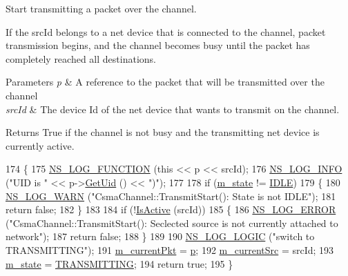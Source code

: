 Start transmitting a packet over the channel. 

If the src\+Id belongs to a net device that is connected to the channel, packet transmission begins, and the channel becomes busy until the packet has completely reached all destinations.


\begin{DoxyParams}{Parameters}
{\em p} & A reference to the packet that will be transmitted over the channel \\
\hline
{\em src\+Id} & The device Id of the net device that wants to transmit on the channel. \\
\hline
\end{DoxyParams}
\begin{DoxyReturn}{Returns}
True if the channel is not busy and the transmitting net device is currently active. 
\end{DoxyReturn}

\begin{DoxyCode}
174 \{
175   \hyperlink{log-macros-disabled_8h_a90b90d5bad1f39cb1b64923ea94c0761}{NS\_LOG\_FUNCTION} (\textcolor{keyword}{this} << p << srcId);
176   \hyperlink{group__logging_gafbd73ee2cf9f26b319f49086d8e860fb}{NS\_LOG\_INFO} (\textcolor{stringliteral}{"UID is "} << p->\hyperlink{classns3_1_1Packet_a1f212c825b50e54d94f5b9ae99592e6a}{GetUid} () << \textcolor{stringliteral}{")"});
177 
178   \textcolor{keywordflow}{if} (\hyperlink{classns3_1_1CsmaChannel_a9c0532c38d511b589274e726ad41037f}{m\_state} != \hyperlink{namespacens3_aff37503a9e9f2dbe82b374050a73e105acb448301f46bfb634e8e803a6fd21264}{IDLE})
179     \{
180       \hyperlink{group__logging_gade7208b4009cdf0e25783cd26766f559}{NS\_LOG\_WARN} (\textcolor{stringliteral}{"CsmaChannel::TransmitStart(): State is not IDLE"});
181       \textcolor{keywordflow}{return} \textcolor{keyword}{false};
182     \}
183 
184   \textcolor{keywordflow}{if} (!\hyperlink{classns3_1_1CsmaChannel_a53b1fd4d944f8342f96477a2d6ade7fc}{IsActive} (srcId))
185     \{
186       \hyperlink{group__logging_ga0261a8db1d4ac5f79417d117634fd455}{NS\_LOG\_ERROR} (\textcolor{stringliteral}{"CsmaChannel::TransmitStart(): Seclected source is not currently attached
       to network"});
187       \textcolor{keywordflow}{return} \textcolor{keyword}{false};
188     \}
189 
190   \hyperlink{group__logging_ga88acd260151caf2db9c0fc84997f45ce}{NS\_LOG\_LOGIC} (\textcolor{stringliteral}{"switch to TRANSMITTING"});
191   \hyperlink{classns3_1_1CsmaChannel_aa6402963543ed7ae413acb321a66101b}{m\_currentPkt} = \hyperlink{lte__link__budget_8m_ac9de518908a968428863f829398a4e62}{p};
192   \hyperlink{classns3_1_1CsmaChannel_af6c1065e71e65be876ab8968c9d54c83}{m\_currentSrc} = srcId;
193   \hyperlink{classns3_1_1CsmaChannel_a9c0532c38d511b589274e726ad41037f}{m\_state} = \hyperlink{namespacens3_aff37503a9e9f2dbe82b374050a73e105a5c6ba0512d778b658dc105cc604de3b3}{TRANSMITTING};
194   \textcolor{keywordflow}{return} \textcolor{keyword}{true};
195 \}
\end{DoxyCode}


